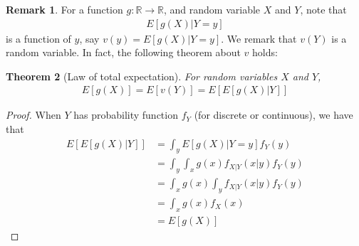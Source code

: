 \documentclass[11pt]{amsart}
\newtheorem{theorem}{Theorem}[section]
\theoremstyle{definition}
\newtheorem{remark}[theorem]{Remark}
\numberwithin{equation}{section}
\begin{document}
 \begin{remark}
     For a function $g:\mathbb R\to\mathbb R$, and random variable $X$ and $Y$, note that
     \begin{align*}
         E[g(X)|Y=y]
     \end{align*}
     is a function of $y$, say $v(y)=E[g(X)|Y=y]$. We remark that $v(Y)$ is a random variable. In fact, the following theorem about $v$ holds:
 \end{remark}
 \begin{theorem}[Law of total expectation]
     For random variables $X$ and $Y$,
     \begin{align*}
         E[g(X)]=E[v(Y)]=E[E[g(X)|Y]]
     \end{align*}
 \end{theorem}
 \begin{proof}
     When $Y$ has probability function $f_Y$ (for discrete or continuous), we have that
     \begin{align*}
         E[E[g(X)|Y]]&=\int_yE[g(X)|Y=y]f_Y(y)\\
         &=\int_{y}\int_xg(x)f_{X|Y}(x|y)f_Y(y)\\
         &=\int_xg(x)\int_yf_{X|Y}(x|y)f_Y(y)\\
         &=\int_xg(x)f_X(x)\\
         &=E[g(X)]
     \end{align*}
 \end{proof}
\end{document}
